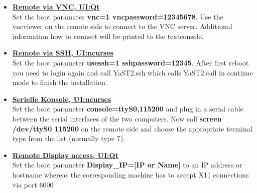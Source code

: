 \begin{itemize}
\item \textbf{\underline{Remote via VNC, UI:Qt}}\\
      Set the boot paramater \textbf{vnc=1 vncpassword=12345678}. Use
      the vncviewer on the remote side to connect to the VNC server.
      Additional information how to connect will be printed to the
      textconsole.
\item \textbf{\underline{Remote via SSH, UI:ncurses}}\\
      Set the boot parameter \textbf{usessh=1 sshpassword=12345}.
      After first reboot you need to login again and call
      YaST2.ssh which calls YaST2.call in continue mode to finish the
      installation.
\item \textbf{\underline{Serielle Konsole, UI:ncurses}}\\
	  Set the boot parameter \textbf{console=ttyS0,115200} and plug in a
      serial cable between the serial interfaces of the two computers. Now
      call \textbf{screen /dev/ttyS0 115200} on the remote side and choose
      the appropriate terminal type from the list (normally type 7).
\item \textbf{\underline{Remote Display access, UI:Qt}}\\
      Set the boot parameter \textbf{Display\_IP=[IP or Name]} to an
      IP address or hostname whereas the corresponding machine has to accept
      X11 connections via port 6000
\end{itemize}
